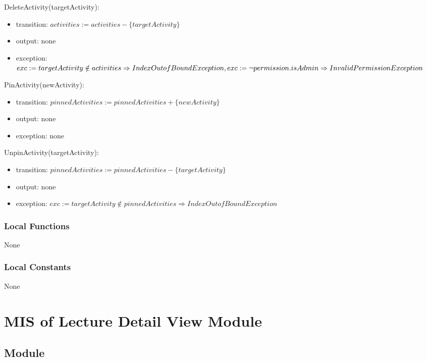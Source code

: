 \documentclass[12pt, titlepage]{article}
\begin{document}
\noindent DeleteActivity(targetActivity):
\begin{itemize}
\item transition: $activities := activities - \{targetActivity\}$
\item output: none
\item exception: $exc := targetActivity \notin activities \Rightarrow IndexOutofBound Exception,\\
                  exc := \neg permission.isAdmin \Rightarrow InvalidPermission Exception$
\end{itemize}

\noindent PinActivity(newActivity):
\begin{itemize}
\item transition: $pinnedActivities := pinnedActivities + \{newActivity\}$
\item output: none
\item exception: none
\end{itemize}

\noindent UnpinActivity(targetActivity):
\begin{itemize}
\item transition: $pinnedActivities := pinnedActivities - \{targetActivity\}$
\item output: none
\item exception: $exc := targetActivity \notin pinnedActivities \Rightarrow IndexOutofBound Exception$
\end{itemize}

\subsubsection{Local Functions}

None

\subsubsection{Local Constants}

None

\newpage

\section{MIS of Lecture Detail View Module} \label{mLDV}

\subsection{Module}
\end{document}
